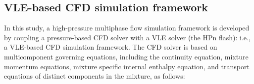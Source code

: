 \subsection{VLE-based CFD simulation framework}
\label{sec:model:cfd}

In this study, a high-pressure multiphase flow simulation framework is developed by coupling a pressure-based CFD solver with a VLE solver (the HPn flash): i.e., a VLE-based CFD simulation framework. %
The CFD solver is based on multicomponent governing equations, including the continuity equation, mixture momentum equations, mixture specific internal enthalpy equation, and transport equations of distinct components in the mixture, as follows:
